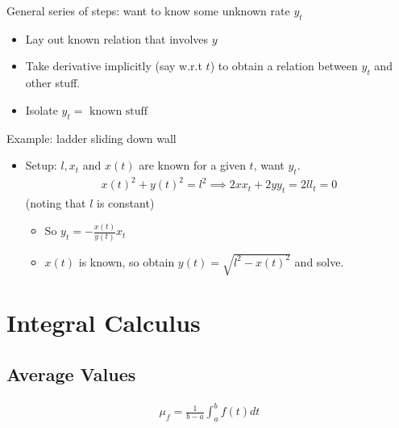 General series of steps: want to know some unknown rate \(y_t\)

\begin{itemize}
\tightlist
\item
  Lay out known relation that involves \(y\)
\item
  Take derivative implicitly (say w.r.t \(t\)) to obtain a relation
  between \(y_t\) and other stuff.
\item
  Isolate \(y_t = \text{ known stuff }\)
\end{itemize}

\begin{example}[?]

Example: ladder sliding down wall

\begin{itemize}
\tightlist
\item
  Setup: \(l, x_t\) and \(x(t)\) are known for a given \(t\), want
  \(y_t\).
  \begin{align*}
  x(t)^2 + y(t)^2 = l^2 \implies 2xx_t +2yy_t = 2ll_t = 0
  \end{align*} (noting that \(l\) is constant)

  \begin{itemize}
  \tightlist
  \item
    So \(y_t = -\frac{x(t)}{y(t)}x_t\)
  \item
    \(x(t)\) is known, so obtain \(y(t) = \sqrt{l^2 - x(t)^2}\) and
    solve.
  \end{itemize}
\end{itemize}

\end{example}

\hypertarget{integral-calculus}{%
\section{Integral Calculus}\label{integral-calculus}}

\hypertarget{average-values}{%
\subsection{Average Values}\label{average-values}}

\begin{proposition}

\begin{align*}
\mu_f = \frac{1}{b-a}\int_a^b f(t) dt
\end{align*}

\end{proposition}

